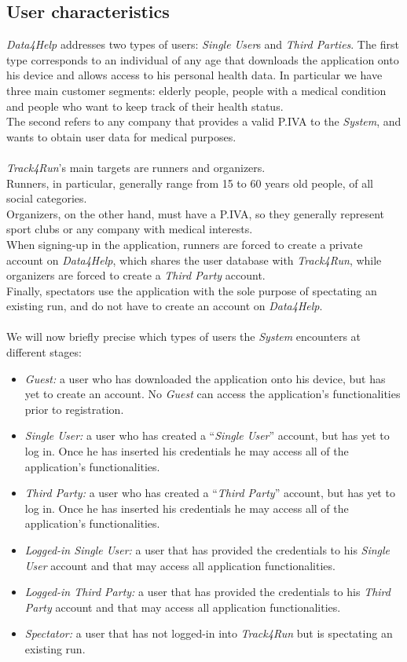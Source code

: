 \documentclass[titlepage]{article}
\begin{document}
	\subsection{User characteristics}
	{\it Data4Help} addresses two types of users: {\it Single User}s and {\it Third Parties}. 
The first type corresponds to an individual of any age that downloads the application onto his device and allows access to his personal health data. In particular we have three main customer segments: elderly people, people with a medical condition and people who want to keep track of their health status. \\
The second refers to any company that provides a valid P.IVA to the {\it System}, and wants to obtain user data for medical purposes.\\
\\
{\it Track4Run}’s main targets are runners and organizers.\\
Runners, in particular, generally range from 15 to 60 years old people, of all social categories. \\
Organizers, on the other hand, must have a P.IVA, so they generally represent sport clubs or any company with medical interests.\\
When signing-up in the application, runners are forced to create a private account on {\it Data4Help}, which shares the user database with {\it Track4Run}, while organizers are forced to create a {\it Third Party} account.\\
Finally, spectators use the application with the sole purpose of spectating an existing run, and do not have to create an account on {\it Data4Help}.\\
\\
We will now briefly precise which types of users the {\it System} encounters at different stages:
\begin{itemize}
	\item{\it {\it Guest}: } a user who has downloaded the application onto his device, but has yet to create an account. No {\it Guest} can access the application’s functionalities prior to registration.
	\item {\it {\it Single User}: } a user who has created a “{\it Single User}” account, but has yet to log in. Once he has inserted his credentials he may access all of the application’s functionalities. 
	\item {\it {\it Third Party}: } a user who has created a “{\it Third Party}” account, but has yet to log in. Once he has inserted his credentials he may access all of the application’s functionalities.
	\item {\it Logged-in {\it Single User}: } a user that has provided the credentials to his {\it Single User} account and that may access all application functionalities.
	\item {\it Logged-in {\it Third Party}: } a user that has provided the credentials to his {\it Third Party} account and that may access all application functionalities.
	\item {\it Spectator: } a user that has not logged-in into {\it Track4Run} but is spectating an existing run. 
\end{itemize}	
\end{document}
